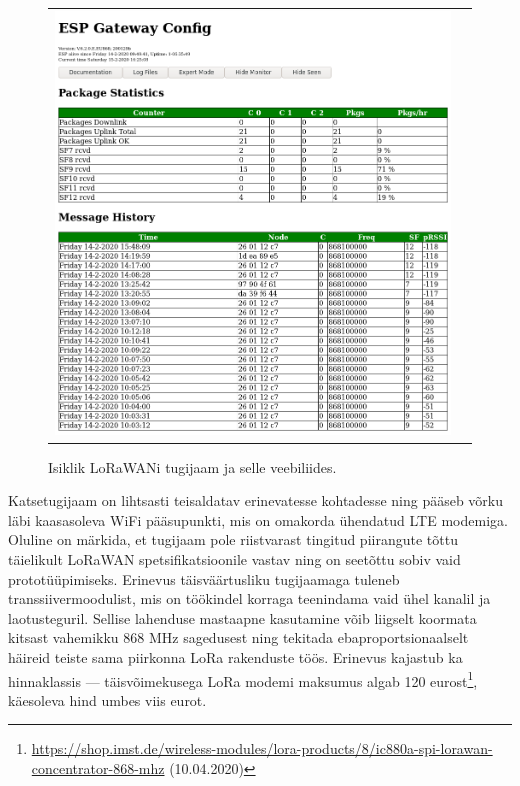 \documentclass[12pt]{article}
\begin{document}
\begin{figure} [htbp]
\begin{tabular}{c c}
\begin{minipage}{0.53\textwidth}
                \includegraphics[width=\textwidth]{figures/ttn-jaama-liides.png}
            \end{minipage}
        \end{tabular}
        \caption{Isiklik LoRaWANi tugijaam ja selle veebiliides.}
        \label{fig:omatugijaam}
    \end{figure}

    Katsetugijaam on lihtsasti teisaldatav erinevatesse kohtadesse ning pääseb võrku läbi kaasasoleva WiFi pääsupunkti, mis on omakorda ühendatud LTE modemiga.
    Oluline on märkida, et tugijaam pole riistvarast tingitud piirangute tõttu täielikult LoRaWAN spetsifikatsioonile vastav ning on seetõttu sobiv vaid prototüüpimiseks.
    Erinevus täisväärtusliku tugijaamaga tuleneb transsiivermoodulist, mis on töökindel korraga teenindama vaid ühel kanalil ja laotusteguril.
    Sellise lahenduse mastaapne kasutamine võib liigselt koormata kitsast vahemikku 868 MHz sagedusest ning tekitada ebaproportsionaalselt häireid teiste sama piirkonna LoRa rakenduste töös.
    Erinevus kajastub ka hinnaklassis — täisvõimekusega LoRa modemi maksumus algab 120 eurost\footnote{\url{https://shop.imst.de/wireless-modules/lora-products/8/ic880a-spi-lorawan-concentrator-868-mhz} (10.04.2020)}, käesoleva hind umbes viis eurot.
\end{document}
